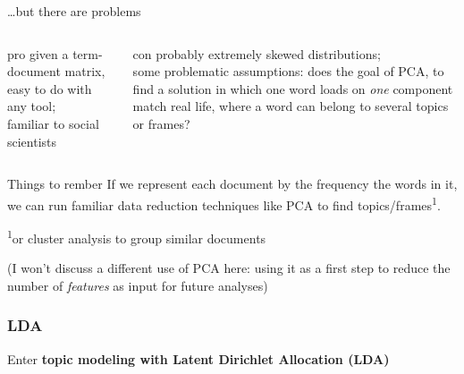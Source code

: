 \documentclass{beamer}
\begin{document}
\begin{frame}{\ldots but there are problems}
	
	
	\begin{columns}[t]
		\begin{exampleblock}{pro}
			given a term-document matrix, easy to do with any tool; \\ familiar to social scientists
		\end{exampleblock}
		\begin{alertblock}{con}
			probably extremely skewed distributions; \\ 
			some problematic assumptions: does the goal of PCA, to find a solution in which one word loads on \emph{one} component match real life, where a word can belong to several topics or frames?
		\end{alertblock}
	\end{columns}
	
	
\end{frame}




\begin{frame}[plain]
	\begin{alertblock}{Things to rember}
	If we represent each document by the frequency the words in it, we can run familiar data reduction techniques like PCA to find topics/frames\textsuperscript{1}.
	\end{alertblock}

\textsuperscript{1}or cluster analysis to group similar documents

\pause
\tiny
(I won't discuss a different use of PCA here: using it as a first step to reduce the number of \textit{features } as input for future analyses)
\end{frame}



\subsubsection{LDA}


\begin{frame}{}
	Enter \textbf{topic modeling with Latent Dirichlet Allocation (LDA)}
\end{frame}
\end{document}

